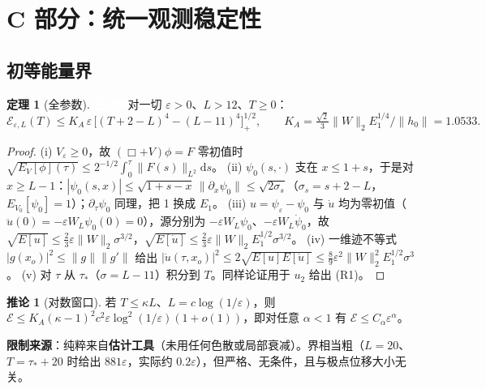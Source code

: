 \documentclass[11pt,a4paper,fontset=windows]{ctexart}
\newcommand{\tagbox}[2]{\begingroup\setlength{\fboxsep}{1.4pt}\colorbox{#1}{\textcolor{white}{\footnotesize\bfseries #2}}\endgroup}
\newcommand{\proven}{\tagbox{green!45!black}{已证明}}
\theoremstyle{definition}
\newtheorem{theorem}{定理}
\newtheorem{corollary}{推论}
\theoremstyle{definition}
\newcommand{\eps}{\varepsilon}
\newcommand{\cE}{\mathcal E}
\newcommand{\dd}{\mathrm d}
\newcommand{\tauS}{\tau_*}
\begin{document}
\section{C 部分：统一观测稳定性}
\subsection{初等能量界}
\begin{theorem}[全参数]\label{thm:A}\proven\enspace 对一切 $\eps>0$、$L>12$、$T\ge0$：
\[
\cE_{\eps,L}(T)\le K_A\,\eps\,\bigl[(T+2-L)^4-(L-11)^4\bigr]_+^{1/2},\qquad K_A=\tfrac{\sqrt2}{3}\|W\|_2E_1^{1/4}/\|h_0\|=1.0533 .
\]
\end{theorem}
\begin{proof}
(i) $V_\eps\ge0$，故 $(\Box+V)\phi=F$ 零初值时 $\sqrt{E_V[\phi](\tau)}\le2^{-1/2}\int_0^\tau\|F(s)\|_{L^2}\dd s$。
(ii) $\psi_0(s,\cdot)$ 支在 $x\le1+s$，于是对 $x\ge L-1$：$|\psi_0(s,x)|\le\sqrt{1+s-x}\,\|\partial_x\psi_0\|\le\sqrt{2\sigma_s}$（$\sigma_s=s+2-L$，$E_{V_0}[\psi_0]=1$）；$\partial_\tau\psi_0$ 同理，把 1 换成 $E_1$。
(iii) $u=\psi_\eps-\psi_0$ 与 $\dot u$ 均为零初值（$\ddot u(0)=-\eps W_L\psi_0(0)=0$），源分别为 $-\eps W_L\psi_0$、$-\eps W_L\dot\psi_0$，故 $\sqrt{E[u]}\le\frac23\eps\|W\|_2\sigma^{3/2}$，$\sqrt{E[\dot u]}\le\frac23\eps\|W\|_2E_1^{1/2}\sigma^{3/2}$。
(iv) 一维迹不等式 $|g(x_o)|^2\le\|g\|\|g'\|$ 给出 $|\dot u(\tau,x_o)|^2\le2\sqrt{E[u]E[\dot u]}\le\frac89\eps^2\|W\|_2^2E_1^{1/2}\sigma^3$。
(v) 对 $\tau$ 从 $\tauS$（$\sigma=L-11$）积分到 $T$。同样论证用于 $u_2$ 给出 (R1)。
\end{proof}
\begin{corollary}[对数窗口]若 $T\le\kappa L$、$L=c\log(1/\eps)$，则 $\cE\le K_A(\kappa-1)^2c^2\eps\log^2(1/\eps)(1+o(1))$，即对任意 $\alpha<1$ 有 $\cE\le C_\alpha\eps^\alpha$。
\end{corollary}
\textbf{限制来源}：纯粹来自\textbf{估计工具}（未用任何色散或局部衰减）。界相当粗（$L=20$、$T=\tauS+20$ 时给出 $881\eps$，实际约 $0.2\eps$），但严格、无条件，且与极点位移大小无关。
\end{document}
